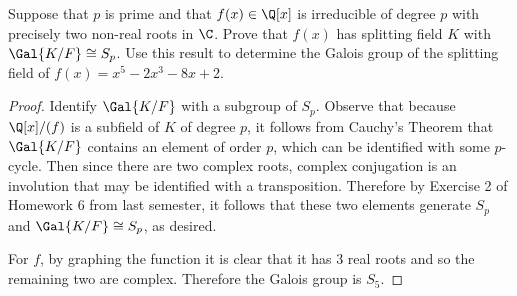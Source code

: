 \documentclass[10pt]{amsart}
\begin{document}
\setcounter{thm}{3}
\begin{thm}
  Suppose that $p$ is prime and that $f(x) \in \Q[x]$ is irreducible of degree $p$ with precisely two non-real roots in $\C$.
  Prove that $f(x)$ has splitting field $K$ with $\Gal{K/F} \cong S_p$.
  Use this result to determine the Galois group of the splitting field of $f(x) = x^5 - 2x^3 - 8x + 2$.
  
  \begin{proof}
    Identify $\Gal{K/F}$ with a subgroup of $S_p$.
    Observe that because $\Q[x]/(f)$ is a subfield of $K$ of degree $p$, it follows from Cauchy's Theorem that $\Gal{K/F}$ contains an element of order $p$, which can be identified with some $p$-cycle.
    Then since there are two complex roots, complex conjugation is an involution that may be identified with a transposition.
    Therefore by Exercise 2 of Homework 6 from last semester, it follows that these two elements generate $S_p$ and $\Gal{K/F} \cong S_p$, as desired.
    
    For $f$, by graphing the function it is clear that it has 3 real roots and so the remaining two are complex.
    Therefore the Galois group is $S_5$.
  \end{proof}
\end{thm}
\end{document}
